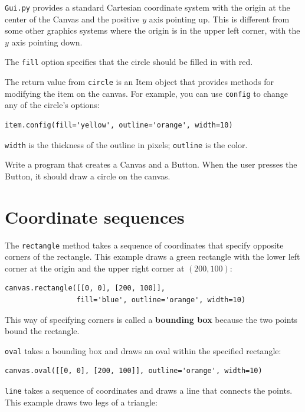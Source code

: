 \documentclass[10pt]{book}
\begin{document}
{

{\tt Gui.py} provides a standard Cartesian coordinate system with
the origin at the center of the Canvas and the positive $y$ axis
pointing up.  This is different from some other graphics systems
where the origin is in the upper left corner, with the $y$ axis
pointing down.

The {\tt fill} option specifies that the circle should be filled
in with red.

The return value from {\tt circle} is an Item object that
provides methods for modifying the item on the canvas.  For
example, you can use {\tt config} to change any of the circle's
options:

\beforeverb
\begin{verbatim}
item.config(fill='yellow', outline='orange', width=10)
\end{verbatim}
\afterverb
%
{\tt width} is the thickness of the outline in pixels;
{\tt outline} is the color.

\begin{ex}
\label{circle}
Write a program that creates a Canvas and a Button.  When the
user presses the Button, it should draw a circle on the canvas.
\end{ex}


\section{Coordinate sequences}


The {\tt rectangle} method takes a sequence of coordinates that
specify opposite corners of the rectangle.  This example
draws a green rectangle with the lower left corner at the origin
and the upper right corner at $(200, 100)$:

\beforeverb
\begin{verbatim}
canvas.rectangle([[0, 0], [200, 100]], 
                 fill='blue', outline='orange', width=10)
\end{verbatim}
\afterverb
%
This way of specifying corners is called
a {\bf bounding box} because the two points
bound the rectangle.


{\tt oval} takes a bounding box and draws an oval
within the specified rectangle:

\beforeverb
\begin{verbatim}
canvas.oval([[0, 0], [200, 100]], outline='orange', width=10)
\end{verbatim}
\afterverb
%
{\tt line} takes a sequence of coordinates and draws
a line that connects the points.  This example draws two legs
of a triangle:

}
\end{document}
